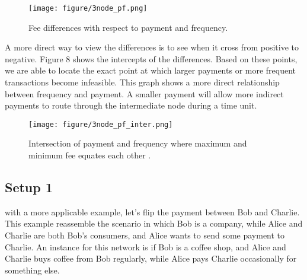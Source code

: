 \documentclass[twocolumn,10pt]{report}
\begin{document}
\begin{figure}[t]
    \begin{center}
    \setlength{\unitlength}{0.012500in}%
    \texttt{[image: figure/3node\_pf.png]}
    \end{center}
    \caption{Fee differences with respect to payment and frequency.}
    \label{figure_3Node7} 
\end{figure}

A more direct way to view the differences is to see when it cross from positive to negative. Figure 8 shows the intercepts of the differences. Based on these points, we are able to locate the exact point at which larger payments or more frequent transactions become infeasible. This graph shows a more direct relationship between frequency and payment. A smaller payment will allow more indirect payments to route through the intermediate node during a time unit. 

\begin{figure}[t]
    \begin{center}
    \setlength{\unitlength}{0.012500in}%
    \texttt{[image: figure/3node\_pf\_inter.png]}
    \end{center}
    \caption{Intersection of payment and frequency where maximum and minimum fee equates each other .}
    \label{figure_3Node8} 
    \end{figure}


\subsection{Setup 1}
with a more applicable example, let's flip the payment between Bob and Charlie. This example reassemble the scenario in which Bob is a company, while Alice and Charlie are both Bob's consumers, and Alice wants to send some payment to Charlie. An instance for this network is if Bob is a coffee shop, and Alice and Charlie buys coffee from Bob regularly, while Alice pays Charlie occasionally for something else. 
\end{document}
